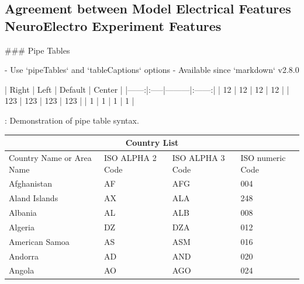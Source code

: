 
\subsection{Agreement between Model Electrical Features NeuroElectro Experiment Features}

\begin{markdown}
### Pipe Tables

- Use `pipeTables` and `tableCaptions` options
- Available since `markdown` v2.8.0

| Right | Left | Default | Center |
|------:|:-----|---------|:------:| 
|  12   |  12  |  12     |   12   | 
| 123   |  123 |   123   |  123   | 
|   1   |    1 |     1   |    1   | 

  : Demonstration of pipe table syntax.
\end{markdown}

\setlength{\arrayrulewidth}{1mm}
\setlength{\tabcolsep}{18pt}
\renewcommand{\arraystretch}{2.5}

\begin{tabular}{ |p{3cm}||p{3cm}|p{3cm}|p{3cm}|  }
 \hline
 \multicolumn{4}{|c|}{Country List} \\
 \hline
 Country Name     or Area Name& ISO ALPHA 2 Code &ISO ALPHA 3 Code&ISO numeric Code\\
 \hline
 Afghanistan   & AF    &AFG&   004\\
 Aland Islands&   AX  & ALA   &248\\
 Albania &AL & ALB&  008\\
 Algeria    &DZ & DZA&  012\\
 American Samoa&   AS  & ASM&016\\
 Andorra& AD  & AND   &020\\
 Angola& AO  & AGO&024\\
 \hline
\end{tabular}

